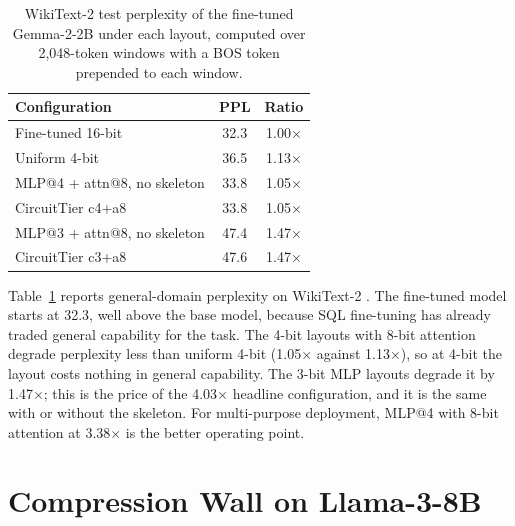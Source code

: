 \documentclass[11pt]{article}
\begin{document}
\begin{table}[t]
\centering
\small
\begin{tabular}{lcc}
\toprule
\textbf{Configuration} & \textbf{PPL} & \textbf{Ratio} \\
\midrule
Fine-tuned 16-bit & 32.3 & 1.00$\times$ \\
Uniform 4-bit & 36.5 & 1.13$\times$ \\
MLP@4 + attn@8, no skeleton & 33.8 & 1.05$\times$ \\
CircuitTier c4+a8 & 33.8 & 1.05$\times$ \\
MLP@3 + attn@8, no skeleton & 47.4 & 1.47$\times$ \\
CircuitTier c3+a8 & 47.6 & 1.47$\times$ \\
\bottomrule
\end{tabular}
\caption{WikiText-2 test perplexity of the fine-tuned 
Gemma-2-2B under each layout, computed over 2,048-token windows 
with a BOS token prepended to each window.}
\label{tab:ppl}
\end{table}

Table~\ref{tab:ppl} reports general-domain perplexity on 
WikiText-2 \cite{merity2016pointersentinelmixturemodels}. The 
fine-tuned model starts at 32.3, well above the base model, 
because SQL fine-tuning has already traded general capability 
for the task. The 4-bit layouts with 8-bit attention degrade 
perplexity less than uniform 4-bit (1.05$\times$ against 
1.13$\times$), so at 4-bit the layout costs nothing in general 
capability. The 3-bit MLP layouts degrade it by 1.47$\times$; 
this is the price of the 4.03$\times$ headline configuration, 
and it is the same with or without the skeleton. For 
multi-purpose deployment, MLP@4 with 8-bit attention at 
3.38$\times$ is the better operating point.

\section{Compression Wall on Llama-3-8B}
\label{app:wall}
\end{document}
